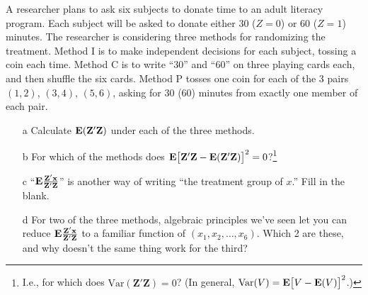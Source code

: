 A researcher plans to ask six subjects to donate time to an adult
literacy program. Each subject will be asked to donate either 30
($Z=0$) or 60 ($Z=1$)
minutes. The researcher is considering three methods for randomizing
the treatment. Method I is to make independent decisions for each
subject, tossing a coin each time. Method C is to
write ``30'' and ``60'' on three playing cards each, and then shuffle
the six cards. Method P tosses one coin for each of the 3 pairs
$(1,2)$, $(3,4)$, $(5,6)$, asking for 30 (60) minutes from exactly one
member of each pair. 

\begin{itemize}
\item[a] Calculate $\mathbf{E}(\mathbf{Z}'\mathbf{Z})$ under each of the three methods.
\item[b] For which of the methods does $\mathbf{E}
  \big[\mathbf{Z}'\mathbf{Z} -\mathbf{E} (\mathbf{Z}'\mathbf{Z})\big]^{2} =
  0$?\footnote{I.e., for which does
    $\mathrm{Var}(\mathbf{Z}'\mathbf{Z}) = 0$?  (In general,
    $\mathrm{Var}(V) = \mathbf{E} \big[V - \mathbf{E}(V) \big]^{2} $.)}
\item[c] ``$\mathbf{E} \frac{\mathbf{Z}'\mathbf{x}}{\mathbf{Z}'\mathbf{Z}}$''
  is another way of writing ``the treatment group
  \underline{\hspace{3em}} of $x$.''  Fill in the blank.
\item[d] For two of the three methods, algebraic principles we've seen
  let you can reduce
  $\mathbf{E} \frac{\mathbf{Z}'\mathbf{x}}{\mathbf{Z}'\mathbf{Z}}$ to a
  familiar function of $(x_{1}, x_{2}, \ldots, x_{6}) $.  Which 2 are
  these, and why doesn't the same thing work for the third?
\end{itemize}
